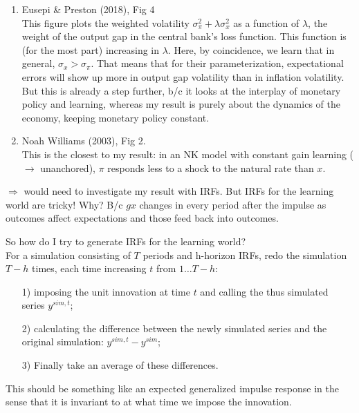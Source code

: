 \documentclass[11pt]{article}
\renewcommand{\[}{\begin{equation}}
\renewcommand{\]}{\end{equation}}
\begin{document}
\begin{enumerate}
\begin{itemize}
\begin{enumerate}
			\item Eusepi \& Preston (2018), Fig 4 \\
			This figure plots the weighted volatility $\sigma_{\pi}^2 + \lambda \sigma_x^2$ as a function of $\lambda$, the weight of the output gap in the central bank's loss function. This function is (for the most part) increasing in $\lambda$. Here, by coincidence, we learn that in general, $\sigma_x > \sigma_{\pi}$. That means that for their parameterization, expectational errors will show up more in output gap volatility than in inflation volatility. \\ 
			But this is already a step further, b/c it looks at the interplay of monetary policy and learning, whereas my result is purely about the dynamics of the economy, keeping monetary policy constant.
			\item Noah Williams (2003), Fig 2. \\
			This is the closest to my result: in an NK model with constant gain learning ($\rightarrow$ unanchored), $\pi$ responds less to a shock to the natural rate than $x$. 
			\end{enumerate}
			$\Rightarrow$ would need to investigate my result with IRFs. But IRFs for the learning world are tricky! Why? B/c $gx$ changes in every period after the impulse as outcomes affect expectations and those feed back into outcomes. 
		\end{itemize}
		So how do I try to generate IRFs for the learning world? \\
		For a simulation consisting of $T$ periods and h-horizon IRFs, redo the simulation $T-h$ times, each time increasing $t$ from $1\dots T-h$:
		\begin{enumerate}
		\item[1)] imposing the unit innovation at time $t$ and calling the thus simulated series $y^{sim,t}$;
		\item[2)] calculating the difference between the newly simulated series and the original simulation: $y^{sim,t} - y^{sim}$;
		\item[3)] Finally take an average of these differences. 
		\end{enumerate}
		This should be something like an expected generalized impulse response in the sense that it is invariant to at what time we impose the innovation. 


\end{enumerate}
\end{document}
